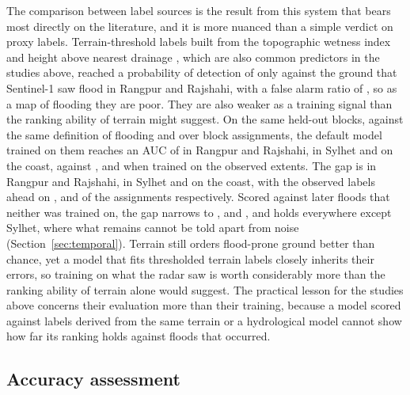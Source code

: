 \documentclass[10pt,a4paper,twocolumn]{article}
\begin{document}
The comparison between label sources is the result from this system that bears most directly on the literature, and it is more nuanced than a simple verdict on proxy labels. Terrain-threshold labels built from the topographic wetness index \citep{beven1979} and height above nearest drainage \citep{nobre2011}, which are also common predictors in the studies above, reached a probability of detection of only \RRProxyPOD{} against the ground that Sentinel-1 saw flood in Rangpur and Rajshahi, with a false alarm ratio of \RRProxyFAR{}, so as a map of flooding they are poor. They are also weaker as a training signal than the ranking ability of terrain might suggest. On the same held-out blocks, against the same definition of flooding and over \RRBenchSeeds{} block assignments, the default model trained on them reaches an AUC of \RRLabelProxyAUC{} in Rangpur and Rajshahi, \SylhetLabelProxyAUC{} in Sylhet and \CoastalLabelProxyAUC{} on the coast, against \RRLabelObsAUC{}, \SylhetLabelObsAUC{} and \CoastalLabelObsAUC{} when trained on the observed extents. The gap is \RRLabelGap{} in Rangpur and Rajshahi, \SylhetLabelGap{} in Sylhet and \CoastalLabelGap{} on the coast, with the observed labels ahead on \RRLabelAhead{}, \SylhetLabelAhead{} and \CoastalLabelAhead{} of the \RRBenchSeeds{} assignments respectively. Scored against later floods that neither was trained on, the gap narrows to \RRTempProxyGap{}, \SylhetTempProxyGap{} and \CoastalTempProxyGap{}, and holds everywhere except Sylhet, where what remains cannot be told apart from noise (Section~\ref{sec:temporal}). Terrain still orders flood-prone ground better than chance, yet a model that fits thresholded terrain labels closely inherits their errors, so training on what the radar saw is worth considerably more than the ranking ability of terrain alone would suggest. The practical lesson for the studies above concerns their evaluation more than their training, because a model scored against labels derived from the same terrain or a hydrological model cannot show how far its ranking holds against floods that occurred.

\subsection{Accuracy assessment}
\label{sec:litval}
\end{document}
